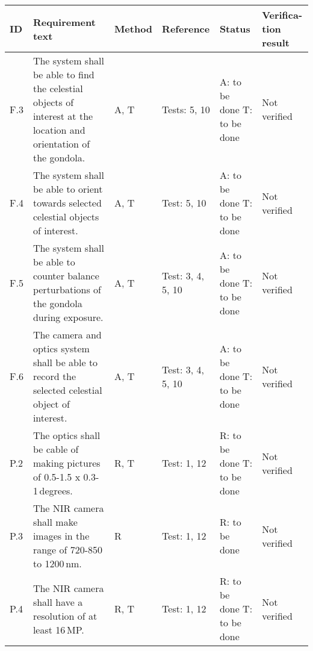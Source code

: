 
\makeatletter
\renewcommand\@makefntext[1]{\leftskip=3em\hskip-1em\@makefnmark#1}
\makeatother

\begin{longtable}[]{|m{}| m{}|m{}|m{}|m{}|m{}|}

\hline
\textbf{ID} & \textbf{Requirement text} & \textbf{Method} & \textbf{Reference} & \textbf{Status} & \textbf{Verifica-tion result} \\\hline

 F.3 & The system shall be able to find the celestial objects of interest at the location and orientation of the gondola.
& A, T & Tests: 5, 10 & A: to be done \newline T: to be done & Not verified \\\hline

  F.4 & The system shall be able to orient towards selected celestial objects of interest.
& A, T & Test: 5, 10 & A: to be done \newline T: to be done & Not verified \\\hline

  F.5 & The system shall be able to counter balance perturbations of the gondola during exposure.
& A, T & Test: 3, 4, 5, 10 & A: to be done \newline T: to be done & Not verified \\\hline

  F.6 & The camera and optics system shall be able to record the selected celestial object of interest.
& A, T & Test: 3, 4, 5, 10 & A: to be done \newline T: to be done & Not verified \\\hline




P.2 & The optics shall be cable of making pictures of 0.5-1.5 x 0.3-1\,degrees.
& R, T & Test: 1, 12 & R: to be done \newline T: to be done  & Not verified \\\hline

P.3 & The NIR camera shall make images in the range of 720-850 to 1200\,nm.
& R & Test: 1, 12 & R: to be done  & Not verified \\\hline

P.4 & The NIR camera shall have a resolution of at least 16\,MP.
& R, T& Test: 1, 12 & R: to be done \newline T: to be done & Not verified \\\hline


\end{longtable}
